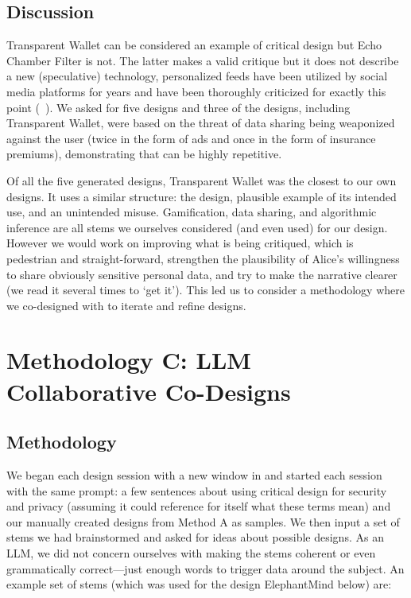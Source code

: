 \subsection{Discussion}

Transparent Wallet can be considered an example of critical design but Echo Chamber Filter is not. The latter makes a valid critique but it does not describe a new (speculative) technology, personalized feeds have been utilized by social media platforms for years and have been thoroughly criticized for exactly this point (\eg~\cite{snakeoil}). We asked for five designs and three of the designs, including Transparent Wallet, were based on the threat of data sharing being weaponized against the user (twice in the form of ads and once in the form of insurance premiums), demonstrating that \gpt can be highly repetitive. 

Of all the five generated designs, Transparent Wallet was the closest to our own designs. It uses a similar structure: the design, plausible example of its intended use, and an unintended misuse. Gamification, data sharing, and algorithmic inference are all stems we ourselves considered (and even used) for our design. However we would work on improving what is being critiqued, which is pedestrian and straight-forward, strengthen the plausibility of Alice's willingness to share obviously sensitive personal data, and try to make the narrative clearer (we read it several times to `get it'). This led us to consider a methodology where we co-designed with \gpt to iterate and refine designs.



\section{Methodology C: LLM Collaborative Co-Designs}
\label{sec:meth3}

\subsection{Methodology}

We began each design session with a new window in \gpt and started each session with the same prompt: a few sentences about using critical design for security and privacy (assuming it could reference for itself what these terms mean) and our manually created designs from Method A as samples. We then input a set of stems we had brainstormed and asked for ideas about possible designs. As an LLM, we did not concern ourselves with making the stems coherent or even grammatically correct---just enough words to trigger data around the subject. An example set of stems (which was used for the design ElephantMind below) are:

